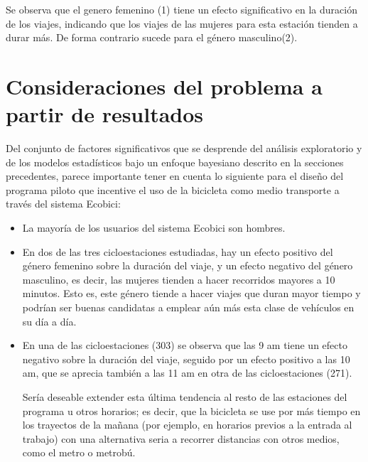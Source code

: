 \documentclass[9pt,twocolumn,twoside]{ilcss}
\begin{document}
Se observa que el genero femenino (1) tiene un efecto significativo en la duración de los viajes, indicando que los viajes de las mujeres para esta estación tienden a durar más. De forma contrario sucede para el género masculino(2).

\section{Consideraciones del problema a partir de resultados}

Del conjunto de factores significativos que se desprende del análisis exploratorio y de los modelos estadísticos bajo un enfoque bayesiano descrito en la secciones precedentes, parece importante tener en cuenta lo siguiente para el diseño del programa piloto que incentive el uso de la bicicleta como medio transporte a través del sistema Ecobici:
\begin{itemize}
  \item La mayoría de los usuarios del sistema Ecobici son hombres.
  \item En dos de las tres cicloestaciones estudiadas, hay un efecto positivo del género femenino sobre la duración del viaje, y un efecto negativo del género masculino, es decir, las mujeres tienden a hacer recorridos mayores a 10 minutos. Esto es, este género tiende a hacer viajes que duran mayor tiempo y podrían ser buenas candidatas  a emplear aún más esta clase de vehículos en su día a día.
  \item En una de las cicloestaciones (303) se observa que las 9 am tiene un efecto negativo sobre la duración del viaje, seguido por un efecto positivo a las 10 am, que se aprecia también a las 11 am en otra de las cicloestaciones (271). 
  
  Sería deseable extender esta última tendencia al resto de las estaciones del programa u otros horarios; es decir, que la bicicleta se use por más tiempo en los trayectos de la mañana (por ejemplo, en horarios previos a la entrada al trabajo) con una alternativa seria a recorrer distancias con otros medios, como el metro o metrobú.
  \end {itemize}
\end{document}
